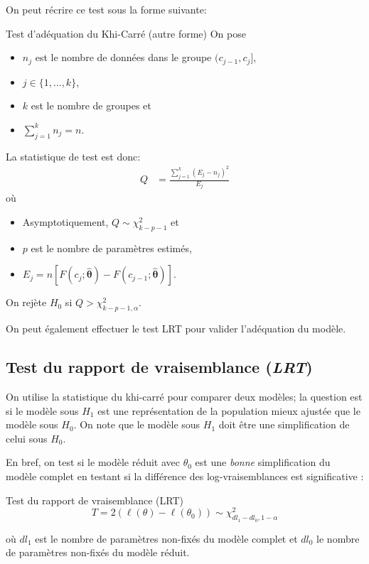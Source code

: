 \documentclass[10pt, french]{article}
\begin{document}
\begin{multicols*}{3}
On peut récrire ce test sous la forme suivante:
\begin{algo}{Test d'adéquation du Khi-Carré (autre forme)}
On pose 
\begin{itemize}
	\item	$n_{j}$ est le nombre de données dans le groupe $(c_{j - 1}, c_{j}]$,
	\item	$j \in \{1, \dots, k \}$,
	\item	$k$ est le nombre de groupes et
	\item	$\sum_{j = 1}^{k}n_{j} = n$.
\end{itemize}

La statistique de test est donc:
\begin{align*}
	Q 
	&= 	\frac{\sum_{j = 1}^{k} (E_j - n_{j})^2 }{E_j} 
\end{align*}
où
\begin{itemize}
	\item	Asymptotiquement, $Q \sim	\chi^{2}_{k - p - 1}$ et 
	\item	$p$ est le nombre de paramètres estimés,
	\item	$E_{j} = n [F(c_{j}; \hat{\bm\theta}) - F(c_{j - 1}; \hat{\bm\theta})]$.
\end{itemize}
On rejète $H_{0}$ si $Q > \chi_{k - p - 1, \alpha}^{2}$.
\end{algo}

On peut également effectuer le test LRT pour valider l'adéquation du modèle.

\subsection*{Test du rapport de vraisemblance (\emph{LRT})}
On utilise la statistique du khi-carré pour comparer deux modèles; la question est si le modèle sous $H_{1}$ est une représentation de la population mieux ajustée que le modèle sous $H_{0}$. 
On note que le modèle sous $H_{1}$ doit être une simplification de celui sous $H_{0}$.

En bref, on test si le modèle réduit avec $\theta_0$ est une \emph{bonne} simplification du modèle complet en testant si la différence des log-vraisemblances est significative : 
\begin{algo}{Test du rapport de vraisemblance (LRT)}
\[
	T 
	= 		2 \left( \ell(\theta) - \ell(\theta_0) \right)
	\sim		\chi_{dl_1 - dl_0, 1 - \alpha}^2
\]
\end{algo}
où $dl_1$ est le nombre de paramètres non-fixés du modèle complet et $dl_0$ le nombre de paramètres non-fixés du modèle réduit. 


\end{multicols*}
\end{document}
